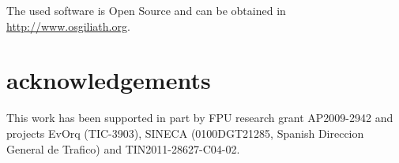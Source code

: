\documentclass[conference]{IEEEtran}
\begin{document}
The used software is Open Source and can be obtained in \url{http://www.osgiliath.org}.

\section*{acknowledgements}
This work has been supported in part by FPU research grant AP2009-2942 and projects EvOrq (TIC-3903), SINECA (0100DGT21285, Spanish Direccion General de Trafico) and TIN2011-28627-C04-02.



\end{document}
